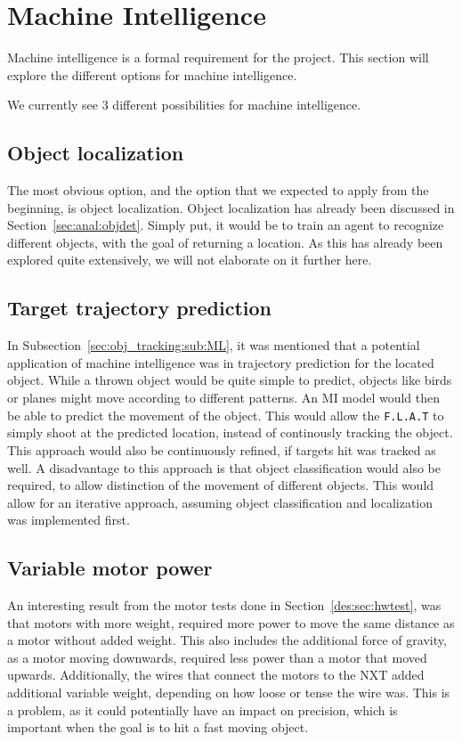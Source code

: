 \section{Machine Intelligence}\label{Design:MI}
Machine intelligence is a formal requirement for the project.
This section will explore the different options for machine intelligence.

We currently see 3 different possibilities for machine intelligence.

\subsection{Object localization}
The most obvious option, and the option that we expected to apply from the beginning, is object localization.
Object localization has already been discussed in Section~\ref{sec:anal:objdet}.
Simply put, it would be to train an agent to recognize different objects, with the goal of returning a location.
As this has already been explored quite extensively, we will not elaborate on it further here.

\subsection{Target trajectory prediction}
In Subsection~\ref{sec:obj_tracking:sub:ML}, it was mentioned that a potential application of machine intelligence was in trajectory prediction for the located object.
While a thrown object would be quite simple to predict, objects like birds or planes might move according to different patterns.
An MI model would then be able to predict the movement of the object.
This would allow the \texttt{F.L.A.T} to simply shoot at the predicted location, instead of continously tracking the object.
This approach would also be continuously refined, if targets hit was tracked as well.
A disadvantage to this approach is that object classification would also be required, to allow distinction of the movement of different objects.
This would allow for an iterative approach, assuming object classification and localization was implemented first.

\subsection{Variable motor power}
An interesting result from the motor tests done in Section~\ref{des:sec:hwtest}, was that motors with more weight, required more power to move the same distance as a motor without added weight.
This also includes the additional force of gravity, as a motor moving downwards, required less power than a motor that moved upwards.
Additionally, the wires that connect the motors to the NXT added additional variable weight, depending on how loose or tense the wire was.
This is a problem, as it could potentially have an impact on precision, which is important when the goal is to hit a fast moving object.

